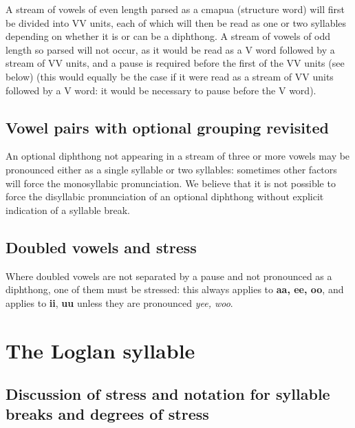 \documentclass[12pt]{book}
\begin{document}
A stream of vowels of even length parsed as a cmapua (structure word) will first be divided into VV units, each of which will then be read as one or two syllables depending on whether it is or can be a diphthong.  A stream of vowels of odd length so parsed will not occur, as it would be read as a V word followed by a stream of VV units, and a pause is required before the first of the VV units (see below) (this would equally be the case if it were read as a stream of VV units followed by a V word:  it would be necessary to pause before the V word).

\subsection{Vowel pairs with optional grouping revisited}

An optional diphthong not appearing in a stream of three or more vowels may be pronounced either as a single syllable or two syllables:  sometimes other factors will force the monosyllabic pronunciation.  We believe that it is not possible to force the disyllabic pronunciation of an optional diphthong without explicit indication of a syllable break.

\subsection{Doubled vowels and stress}

Where doubled vowels are not separated by a pause and not pronounced as a diphthong, one of them must be stressed:  this always applies to {\bf aa, ee, oo}, and applies
to {\bf ii}, {\bf uu} unless they are pronounced {\em yee, woo}.

\section{The Loglan syllable}

\subsection{Discussion of stress and notation for syllable breaks and degrees of stress}
\end{document}
